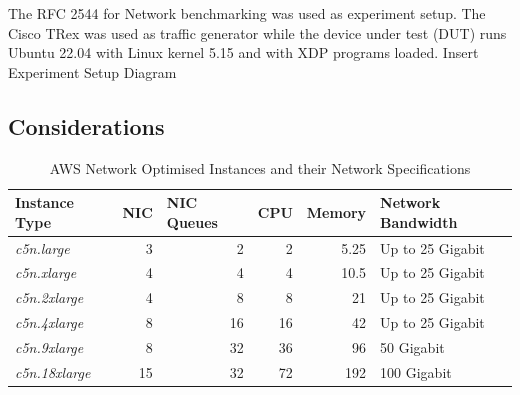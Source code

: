 \documentclass[12pt,titlepage]{article}
\begin{document}
The RFC 2544 \cite{rfc2544} for Network benchmarking was used as experiment setup. The Cisco TRex \cite{cisco18:_trex_traff_gener} was used as traffic generator while the device under test (DUT) runs Ubuntu 22.04 with Linux kernel 5.15 and with XDP programs loaded. 
Insert Experiment Setup Diagram 

\subsection{Considerations}


\begin{table}[]
\begin{tabular}{|l|r|r|r|r|l|}
\hline
\textbf{Instance Type} & \multicolumn{1}{l|}{\textbf{NIC}} & \multicolumn{1}{l|}{\textbf{NIC Queues}} & \multicolumn{1}{l|}{\textbf{CPU}} & \multicolumn{1}{l|}{\textbf{Memory}} & \textbf{Network Bandwidth} \\ \hline
\textit{c5n.large}     & 3                                 & 2                                        & 2                                 & 5.25                                 & Up to 25 Gigabit           \\ \hline
\textit{c5n.xlarge}    & 4                                 & 4                                        & 4                                 & 10.5                                 & Up to 25 Gigabit           \\ \hline
\textit{c5n.2xlarge}   & 4                                 & 8                                        & 8                                 & 21                                   & Up to 25 Gigabit           \\ \hline
\textit{c5n.4xlarge}   & 8                                 & 16                                       & 16                                & 42                                   & Up to 25 Gigabit           \\ \hline
\textit{c5n.9xlarge}   & 8                                 & 32                                       & 36                                & 96                                   & 50 Gigabit                 \\ \hline
\textit{c5n.18xlarge}  & 15                                & 32                                       & 72                                & 192                                  & 100 Gigabit                \\ \hline
\end{tabular}
\caption{AWS Network Optimised Instances and their Network Specifications}
\label{tab:aws-table}
\end{table}
\end{document}
